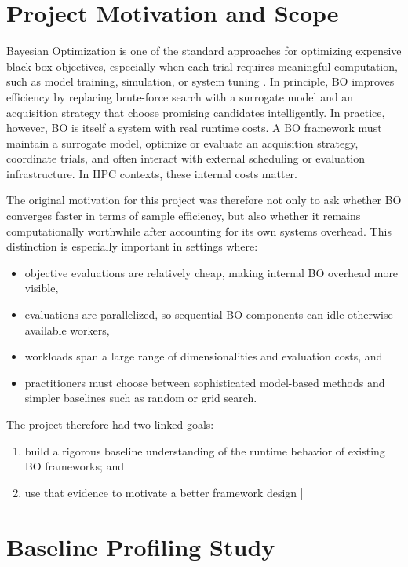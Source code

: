 \documentclass[11pt]{article}
\begin{document}
\section{Project Motivation and Scope}

Bayesian Optimization is one of the standard approaches for optimizing expensive black-box objectives, especially when each trial requires meaningful computation, such as model training, simulation, or system tuning \cite{brochu2010tutorial, shahriari2016review}. In principle, BO improves efficiency by replacing brute-force search with a surrogate model and an acquisition strategy that choose promising candidates intelligently. In practice, however, BO is itself a system with real runtime costs. A BO framework must maintain a surrogate model, optimize or evaluate an acquisition strategy, coordinate trials, and often interact with external scheduling or evaluation infrastructure. In HPC contexts, these internal costs matter.

The original motivation for this project was therefore not only to ask whether BO converges faster in terms of sample efficiency, but also whether it remains computationally worthwhile after accounting for its own systems overhead. This distinction is especially important in settings where:
\begin{itemize}[leftmargin=1.5em]
    \item objective evaluations are relatively cheap, making internal BO overhead more visible,
    \item evaluations are parallelized, so sequential BO components can idle otherwise available workers,
    \item workloads span a large range of dimensionalities and evaluation costs, and
    \item practitioners must choose between sophisticated model-based methods and simpler baselines such as random or grid search.
\end{itemize}

The project therefore had two linked goals:
\begin{enumerate}[leftmargin=1.5em]
    \item build a rigorous baseline understanding of the runtime behavior of existing BO frameworks; and
    \item use that evidence to motivate a better framework design ]
\end{enumerate}

\section{Baseline Profiling Study}
\end{document}
